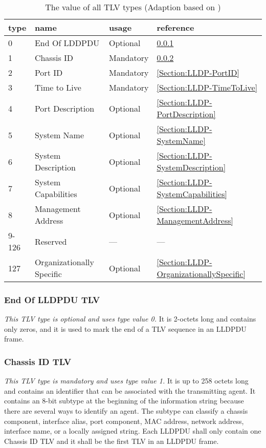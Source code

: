 \begin{table}[h]
    \begin{center}
    \begin{tabular}{|l|l|l|l|}
        \hline
        \rowcolor{lightgray!60} type & name & usage & reference \\ 
        \hline
        0 & End Of LDDPDU & Optional & \ref{Section:LLDP-EndOfLLDPDU} \\ 
        \hline
        1 & Chassis ID & Mandatory & \ref{Section:LLDP-ChassisID} \\ 
        \hline
        2 & Port ID & Mandatory & \ref{Section:LLDP-PortID} \\ 
        \hline
        3 & Time to Live & Mandatory & \ref{Section:LLDP-TimeToLive} \\ 
        \hline
        4 & Port Description & Optional & \ref{Section:LLDP-PortDescription} \\ 
        \hline
        5 & System Name & Optional & \ref{Section:LLDP-SystemName} \\ 
        \hline
        6 & System Description & Optional & \ref{Section:LLDP-SystemDescription} \\ 
        \hline
        7 & System Capabilities & Optional & \ref{Section:LLDP-SystemCapabilities} \\ 
        \hline
        8 & Management Address & Optional & \ref{Section:LLDP-ManagementAddress} \\ 
        \hline
        9-126 & Reserved & --- & --- \\ 
        \hline
        127 & Organizationally Specific & Optional & \ref{Section:LLDP-OrganizationallySpecific} \\ 
        \hline
    \end{tabular}
    \caption{The value of all TLV types (Adaption based on \cite{IEEE:LLDP:2016})}
    \label{Table:LLDP-TLVTypes}
    \end{center}
\end{table}

\subsubsection{End Of LLDPDU TLV}
\label{Section:LLDP-EndOfLLDPDU}
\textit{This TLV type is optional and uses type value 0.} It is 2-octets long and contains only zeros, and it is used to mark the end of a TLV sequence in an LLDPDU frame.

\subsubsection{Chassis ID TLV}
\label{Section:LLDP-ChassisID}
\textit{This TLV type is mandatory and uses type value 1.} It is up to 258 octets long and contains an identifier that can be associated with the transmitting agent. It contains an 8-bit subtype at the beginning of the information string because there are several ways to identify an agent. The subtype can classify a chassis component, interface alias, port component, MAC address, network address, interface name, or a locally assigned string. Each LLDPDU shall only contain one Chassis ID TLV and it shall be the first TLV in an LLDPDU frame.

